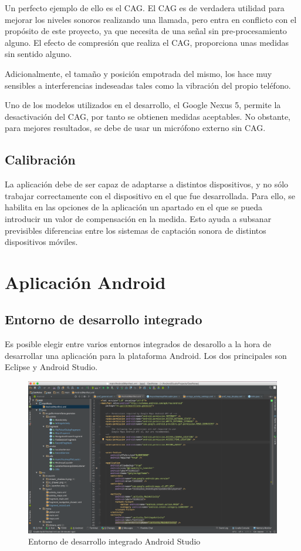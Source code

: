 Un perfecto ejemplo de ello es el \ac{CAG}. El \ac{CAG} es de verdadera utilidad para mejorar los niveles sonoros realizando una llamada, pero entra en conflicto con el propósito de este proyecto, ya que necesita de una señal sin pre-procesamiento alguno. El efecto de compresión que realiza el \ac{CAG}, proporciona unas medidas sin sentido alguno.

Adicionalmente, el tamaño y posición empotrada del mismo, los hace muy sensibles a interferencias indeseadas tales como la vibración del propio teléfono.

Uno de los modelos utilizados en el desarrollo, el Google Nexus 5, permite la desactivación del \ac{CAG}, por tanto se obtienen medidas aceptables. No obstante, para mejores resultados, se debe de usar un micrófono externo sin \ac{CAG}.

\subsection{Calibración}
La aplicación debe de ser capaz de adaptarse a distintos dispositivos, y no sólo trabajar correctamente con el dispositivo en el que fue desarrollada. Para ello, se habilita en las opciones de la aplicación un apartado en el que se pueda introducir un valor de compensación en la medida. Esto ayuda a subsanar previsibles diferencias entre los sistemas de captación sonora de distintos dispositivos móviles.

\section{Aplicación Android}

\subsection{Entorno de desarrollo integrado}
\label{sec:IDE}
Es posible elegir entre varios entornos integrados de desarollo a la hora de desarrollar una aplicación para la plataforma Android. Los dos principales son Eclipse y Android Studio.
\begin{figure}[h] \centering
    \includegraphics[width=12cm]{graphs/intellij.png} \caption{Entorno de desarrollo integrado Android Studio}\label{fig:astudio}
\end{figure}

